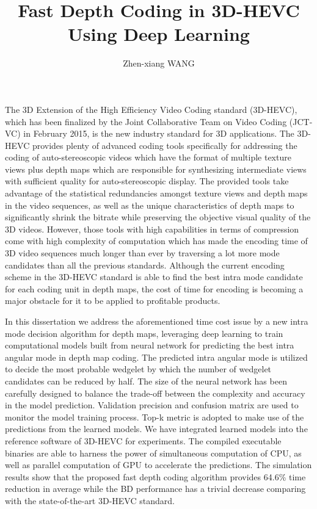 \documentclass{report}
\begin{document}
    \title{Fast Depth Coding in 3D-HEVC
    Using Deep Learning}
    \author{Zhen-xiang WANG}
    \beforepreface
    The 3D Extension of the High Efficiency Video Coding standard (3D-HEVC),
    which has been finalized by the Joint Collaborative Team on Video Coding
    (JCT-VC) in February 2015, is the new industry standard for 3D applications.
    The 3D-HEVC provides plenty of advanced coding tools specifically
    for addressing the coding of auto-stereoscopic videos which have the format
    of multiple texture views plus depth maps which are responsible
    for synthesizing intermediate views with sufficient quality for
    auto-stereoscopic display.
    The provided tools take advantage of the statistical redundancies amongst
    texture views and depth maps in the video sequences, as well as the unique
    characteristics of depth maps to significantly shrink the bitrate
    while preserving the objective visual quality of the
    3D videos.
    However, those tools with high capabilities in terms of compression come
    with high complexity of computation which has made the encoding time
    of 3D video sequences much longer than ever by traversing a lot more
    mode candidates than all the previous standards.
    Although the current encoding scheme in the 3D-HEVC standard 
    is able to find the best
    intra mode candidate for each coding unit in depth maps, the cost
    of time for encoding is becoming a major obstacle for it to be applied
    to profitable products.

    In this dissertation we address the aforementioned time cost issue by a new
    intra mode decision algorithm for depth maps, leveraging 
    deep learning to train computational models built from neural network
    for predicting 
    the best intra angular mode
    in depth map coding.
    The predicted intra angular mode is utilized to decide the 
    most probable wedgelet by which the number of wedgelet 
    candidates can be reduced by half.
    The size of the neural network has been carefully designed to balance
    the trade-off between the complexity and accuracy in the model prediction.
    Validation precision and confusion matrix are used to monitor 
    the model training process.
    Top-k metric is adopted to make use of the predictions
    from the learned models.
    We have integrated learned models into the reference software of
    3D-HEVC for experiments.
    The compiled executable binaries are able to harness
    the power of simultaneous computation of CPU, as well as
    parallel computation of GPU to accelerate the predictions.
    The simulation results show that the proposed 
    fast depth coding algorithm
    provides 64.6\% time reduction in average while the
    BD performance has a trivial decrease comparing with 
    the state-of-the-art 3D-HEVC standard.
\end{document}
